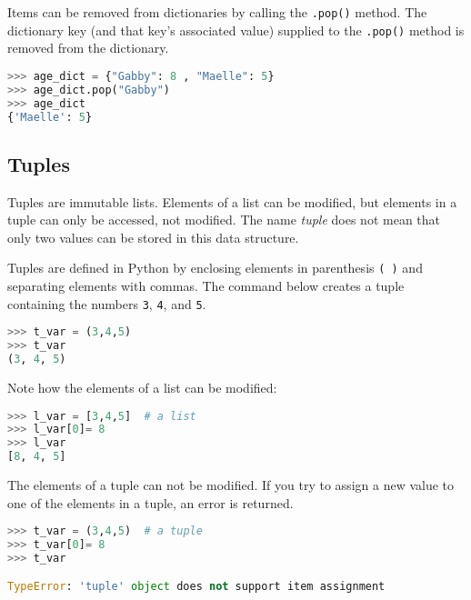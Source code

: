 \documentclass{book}
\newcommand{\passthrough}[1]{#1}
\begin{document}
Items can be removed from dictionaries by calling the
\passthrough{\lstinline!.pop()!} method. The dictionary key (and that
key's associated value) supplied to the \passthrough{\lstinline!.pop()!}
method is removed from the dictionary.

\begin{lstlisting}[language=Python]
>>> age_dict = {"Gabby": 8 , "Maelle": 5}
>>> age_dict.pop("Gabby")
>>> age_dict
{'Maelle': 5}
\end{lstlisting}
    




    
        \hypertarget{tuples}{%
\subsection{Tuples}\label{tuples}}
    




    
        Tuples are immutable lists. Elements of a list can be modified, but
elements in a tuple can only be accessed, not modified. The name
\emph{tuple} does not mean that only two values can be stored in this
data structure.

Tuples are defined in Python by enclosing elements in parenthesis
\passthrough{\lstinline!( )!} and separating elements with commas. The
command below creates a tuple containing the numbers
\passthrough{\lstinline!3!}, \passthrough{\lstinline!4!}, and
\passthrough{\lstinline!5!}.

\begin{lstlisting}[language=Python]
>>> t_var = (3,4,5)
>>> t_var
(3, 4, 5)
\end{lstlisting}

Note how the elements of a list can be modified:

\begin{lstlisting}[language=Python]
>>> l_var = [3,4,5]  # a list
>>> l_var[0]= 8
>>> l_var
[8, 4, 5]
\end{lstlisting}

The elements of a tuple can not be modified. If you try to assign a new
value to one of the elements in a tuple, an error is returned.

\begin{lstlisting}[language=Python]
>>> t_var = (3,4,5)  # a tuple
>>> t_var[0]= 8
>>> t_var

TypeError: 'tuple' object does not support item assignment
\end{lstlisting}
\end{document}

